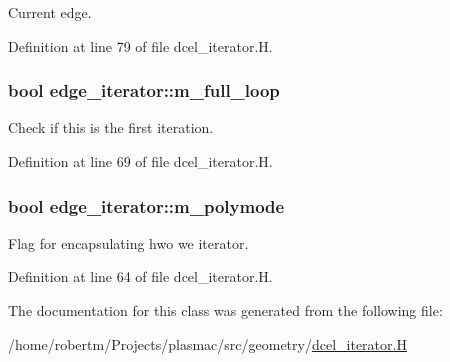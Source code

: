 Current edge. 



Definition at line 79 of file dcel\+\_\+iterator.\+H.

\subsubsection[{\texorpdfstring{m\+\_\+full\+\_\+loop}{m_full_loop}}]{\setlength{\rightskip}{0pt plus 5cm}bool edge\+\_\+iterator\+::m\+\_\+full\+\_\+loop\hspace{0.3cm}{\ttfamily [protected]}}\hypertarget{classedge__iterator_a657a86b5eecd08e6bb2258a492f28870}{}\label{classedge__iterator_a657a86b5eecd08e6bb2258a492f28870}


Check if this is the first iteration. 



Definition at line 69 of file dcel\+\_\+iterator.\+H.

\subsubsection[{\texorpdfstring{m\+\_\+polymode}{m_polymode}}]{\setlength{\rightskip}{0pt plus 5cm}bool edge\+\_\+iterator\+::m\+\_\+polymode\hspace{0.3cm}{\ttfamily [protected]}}\hypertarget{classedge__iterator_acd0bfd3a365cbf562f6a993cef83aab6}{}\label{classedge__iterator_acd0bfd3a365cbf562f6a993cef83aab6}


Flag for encapsulating hwo we iterator. 



Definition at line 64 of file dcel\+\_\+iterator.\+H.



The documentation for this class was generated from the following file\+:\begin{DoxyCompactItemize}
\item 
/home/robertm/\+Projects/plasmac/src/geometry/\hyperlink{dcel__iterator_8H}{dcel\+\_\+iterator.\+H}\end{DoxyCompactItemize}
